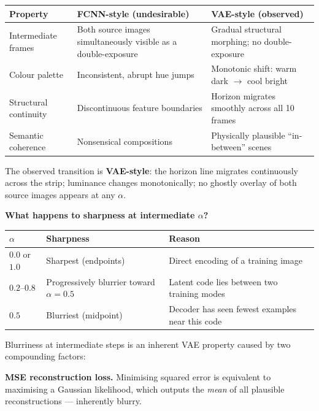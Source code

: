 \documentclass[11pt,a4paper]{article}
\begin{document}
\begin{center}
\begin{tabular}{p{3.8cm}p{5.0cm}p{5.0cm}}
\toprule
\textbf{Property} & \textbf{FCNN-style (undesirable)} & \textbf{VAE-style (observed)} \\
\midrule
Intermediate frames   & Both source images simultaneously visible as a double-exposure
                      & Gradual structural morphing; no double-exposure \\
Colour palette        & Inconsistent, abrupt hue jumps
                      & Monotonic shift: warm dark $\to$ cool bright \\
Structural continuity & Discontinuous feature boundaries
                      & Horizon migrates smoothly across all 10 frames \\
Semantic coherence    & Nonsensical compositions
                      & Physically plausible ``in-between'' scenes \\
\bottomrule
\end{tabular}
\end{center}

The observed transition is \textbf{VAE-style}: the horizon line migrates continuously across the
strip; luminance changes monotonically; no ghostly overlay of both source images appears at
any $\alpha$.

\textbf{What happens to sharpness at intermediate $\alpha$?}

\begin{center}
\begin{tabular}{p{3cm}p{4cm}p{6.5cm}}
\toprule
$\alpha$ & Sharpness & Reason \\
\midrule
$0.0$ or $1.0$ & Sharpest (endpoints) & Direct encoding of a training image \\
$0.2$--$0.8$   & Progressively blurrier toward $\alpha=0.5$ & Latent code lies between two training modes \\
$0.5$          & Blurriest (midpoint)  & Decoder has seen fewest examples near this code \\
\bottomrule
\end{tabular}
\end{center}

Blurriness at intermediate steps is an inherent VAE property caused by two compounding factors:

\textbf{MSE reconstruction loss.} Minimising squared error is equivalent to maximising a Gaussian
likelihood, which outputs the \emph{mean} of all plausible reconstructions --- inherently blurry.
\end{document}
